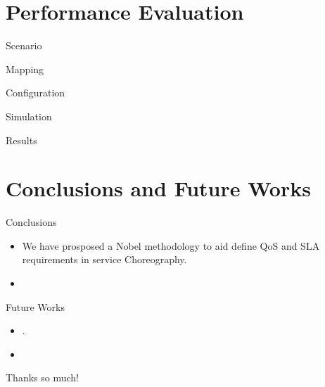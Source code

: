 \documentclass[xcolor=svgnames]{beamer}
\begin{document}
\section{Performance Evaluation}
  \begin{frame}{Scenario}
  
  \end{frame}


  \begin{frame}{Mapping}
   
  \end{frame}


  \begin{frame}{ Configuration}
   
  \end{frame}


  \begin{frame}{ Simulation}
   
  \end{frame}



  \begin{frame}{ Results}
   
  \end{frame}





\section{Conclusions and Future Works}
   \begin{frame}{Conclusions}
       \begin{itemize}
         \item <1->  We have prosposed a Nobel methodology to aid define QoS and SLA requirements in service Choreography.
	 \item <2->  
       \end{itemize}
   \end{frame}

  \begin{frame}{Future Works}
       \begin{itemize}
         \item <1->  .
	 \item <2->  
       \end{itemize}
   \end{frame}





    \begin{frame}%
        \begin{block}{}\vspace{-.3\baselineskip}
        	Thanks so much!
        \end{block}

    \end{frame}
\end{document}
